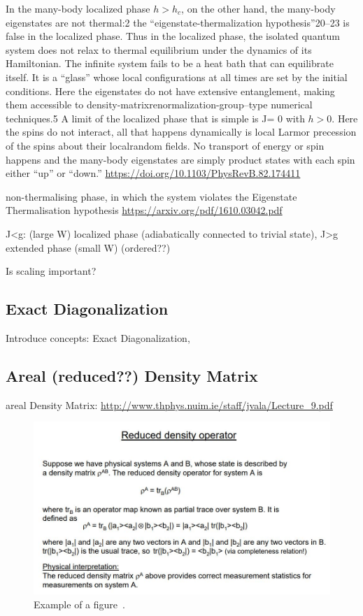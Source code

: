 \documentclass[reprint,amsmath,amssymb,aps,prb]{revtex4-2}
\begin{document}
In the many-body localized phase $h>h_c$, on the other
hand, the many-body eigenstates are not thermal:2 the
“eigenstate-thermalization hypothesis”20–23 is false in the
localized phase. Thus in the localized phase, the isolated
quantum system does not relax to thermal equilibrium
under the dynamics of its Hamiltonian. The infinite system
fails to be a heat bath that can equilibrate itself. It is a
“glass” whose local configurations at all times are set by the
initial conditions. Here the eigenstates do not have extensive
entanglement, making them accessible to density-matrixrenormalization-group–type
numerical techniques.5 A limit
of the localized phase that is simple is J= 0 with $h>0$. Here
the spins do not interact, all that happens dynamically is
local Larmor precession of the spins about their localrandom
fields. No transport of energy or spin happens and
the many-body eigenstates are simply product states with
each spin either “up” or “down.”
\url{https://doi.org/10.1103/PhysRevB.82.174411}


non-thermalising phase, in which the system violates the Eigenstate Thermalisation hypothesis
\url{https://arxiv.org/pdf/1610.03042.pdf}


J<g: (large W) localized phase (adiabatically connected to trivial state), J>g extended phase (small W) (ordered??)

Is scaling important?

\subsection{Exact Diagonalization}

Introduce concepts: Exact Diagonalization, 

\subsection{Areal (reduced??) Density Matrix}

areal Density Matrix:
\url{http://www.thphys.nuim.ie/staff/jvala/Lecture_9.pdf}

\begin{figure}[h!]
	\includegraphics[width=0.99\linewidth]{figures/reduced_density_matrix.jpg}
	\caption{Example of a figure~\cite{Orus2013}.}
	\label{fig:adm}
\end{figure}
\end{document}
